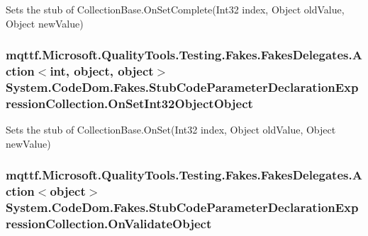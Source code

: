 Sets the stub of Collection\-Base.\-On\-Set\-Complete(\-Int32 index, Object old\-Value, Object new\-Value)

\hypertarget{class_system_1_1_code_dom_1_1_fakes_1_1_stub_code_parameter_declaration_expression_collection_aaf786215ad12091b3bbec69ed89473cd}{
\subsubsection[{On\-Set\-Int32\-Object\-Object}]{\setlength{\rightskip}{0pt plus 5cm}mqttf.\-Microsoft.\-Quality\-Tools.\-Testing.\-Fakes.\-Fakes\-Delegates.\-Action$<$int, object, object$>$ System.\-Code\-Dom.\-Fakes.\-Stub\-Code\-Parameter\-Declaration\-Expression\-Collection.\-On\-Set\-Int32\-Object\-Object}}\label{class_system_1_1_code_dom_1_1_fakes_1_1_stub_code_parameter_declaration_expression_collection_aaf786215ad12091b3bbec69ed89473cd}


Sets the stub of Collection\-Base.\-On\-Set(\-Int32 index, Object old\-Value, Object new\-Value)

\hypertarget{class_system_1_1_code_dom_1_1_fakes_1_1_stub_code_parameter_declaration_expression_collection_a9a95ca73376ee9347d0773d271c6533b}{
\subsubsection[{On\-Validate\-Object}]{\setlength{\rightskip}{0pt plus 5cm}mqttf.\-Microsoft.\-Quality\-Tools.\-Testing.\-Fakes.\-Fakes\-Delegates.\-Action$<$object$>$ System.\-Code\-Dom.\-Fakes.\-Stub\-Code\-Parameter\-Declaration\-Expression\-Collection.\-On\-Validate\-Object}}\label{class_system_1_1_code_dom_1_1_fakes_1_1_stub_code_parameter_declaration_expression_collection_a9a95ca73376ee9347d0773d271c6533b}


